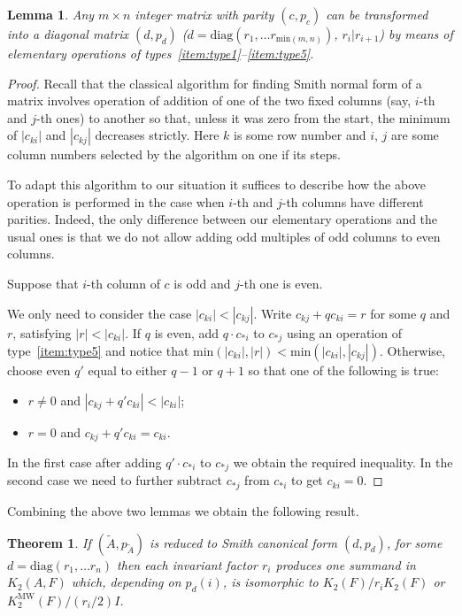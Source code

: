 \documentclass[oneside, 10pt]{amsart}
\theoremstyle{plain}
\newtheorem{thm}{Theorem}
\newtheorem{lemma}{Lemma}
\theoremstyle{remark}
\theoremstyle{definition}
\newcommand{\K}{K_2}
\newcommand{\Kmw}{K^{\mathrm{MW}}_2}
\begin{document}
\begin{lemma} \label{lm:normal-form} Any $m \times n$ integer matrix with parity $(c, p_c)$ can be transformed into a diagonal matrix $(d, p_d)$
  ($d = \mathrm{diag}(r_1, \ldots r_{\mathrm{min}(m, n)})$, $r_i | r_{i+1}$)
   by means of elementary operations of types~\eqref{item:type1}--\eqref{item:type5}.
\end{lemma}
\begin{proof} 
Recall that the classical algorithm for finding Smith normal form of a matrix involves
 operation of addition of one of the two fixed columns (say, $i$-th and $j$-th ones) to another
 so that, unless it was zero from the start, the minimum of $|c_{ki}|$ and $|c_{kj}|$ decreases strictly. 
 Here $k$ is some row number and $i$, $j$ are some column numbers selected by the algorithm on one if its steps.

To adapt this algorithm to our situation it suffices to describe
 how the above operation is performed in the case when $i$-th and $j$-th columns have different parities.
Indeed, the only difference between our elementary operations and the usual ones is that
 we do not allow adding odd multiples of odd columns to even columns.

Suppose that $i$-th column of $c$ is odd and $j$-th one is even.

We only need to consider the case $|c_{ki}| < |c_{kj}|$. Write $c_{kj} + q c_{ki} = r$ for some $q$ and $r$, satisfying $|r| < |c_{ki}|$.
If $q$ is even, add $q \cdot c_{*i}$ to $c_{*j}$ using an operation of type~\eqref{item:type5} and 
 notice that $\mathrm{min}(|c_{ki}|,|r|) < \mathrm{min}(|c_{ki}|,|c_{kj}|)$.
Otherwise, choose even $q'$ equal to either $q-1$ or $q+1$ so that one of the following is true:
\begin{itemize}
 \item $r\neq 0$ and $|c_{kj} + q' c_{ki}| < |c_{ki}|$;
 \item $r = 0$ and $c_{kj} + q' c_{ki} = c_{ki}$.
\end{itemize}
In the first case after adding $q' \cdot c_{*i}$ to $c_{*j}$ we obtain the required inequality.
In the second case we need to further subtract $c_{*j}$ from $c_{*i}$ to get $c_{ki} = 0$.
\end{proof}

Combining the above two lemmas we obtain the following result.
\begin{thm}
If $(\widetilde{A}, p_{\widetilde{A}})$ is reduced to Smith canonical form $(d, p_d)$, for some $d = \mathrm{diag}(r_1, \ldots r_n)$ then
 each invariant factor $r_i$ produces one summand in $\K(A, F)$ which, depending on $p_d(i)$, 
 is isomorphic to $\K(F)/r_i \K(F)$ or $\Kmw(F) / (r_i/2) I$.
\end{thm}
\end{document}
